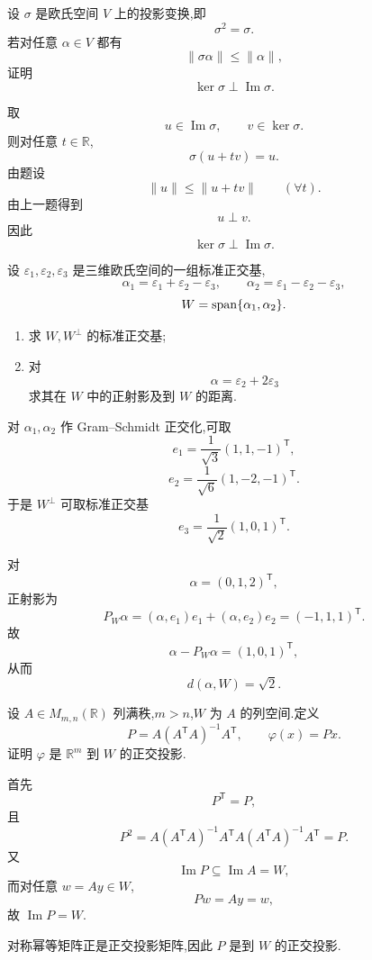 \begin{example}
设 $\sigma$ 是欧氏空间 $V$ 上的投影变换,即
\[
\sigma^2=\sigma.
\]
若对任意 $\alpha\in V$ 都有
\[
\|\sigma\alpha\|\le\|\alpha\|,
\]
证明
\[
\ker\sigma\perp\operatorname{Im}\sigma.
\]
\end{example}
\exampleblank

\begin{solution}
取
\[
u\in\operatorname{Im}\sigma,
\qquad
v\in\ker\sigma.
\]
则对任意 $t\in\mathbb{R}$,
\[
\sigma(u+tv)=u.
\]
由题设
\[
\|u\|
\le
\|u+tv\|
\qquad
(\forall t).
\]
由上一题得到
\[
u\perp v.
\]
因此
\[
\boxed{\ker\sigma\perp\operatorname{Im}\sigma}.
\]
\end{solution}


\begin{example}
设 $\varepsilon_1,\varepsilon_2,\varepsilon_3$ 是三维欧氏空间的一组标准正交基,
\[
\alpha_1=\varepsilon_1+\varepsilon_2-\varepsilon_3,
\qquad
\alpha_2=\varepsilon_1-\varepsilon_2-\varepsilon_3,
\]
\[
W=\operatorname{span}\{\alpha_1,\alpha_2\}.
\]
\begin{enumerate}
    \item 求 $W,W^\perp$ 的标准正交基;
    \item 对
    \[
    \alpha=\varepsilon_2+2\varepsilon_3
    \]
    求其在 $W$ 中的正射影及到 $W$ 的距离.
\end{enumerate}
\end{example}
\exampleblank

\begin{solution}
对 $\alpha_1,\alpha_2$ 作 Gram--Schmidt 正交化,可取
\[
 e_1
 =
 \dfrac{1}{\sqrt3}(1,1,-1)^{\mathsf T},
\]
\[
 e_2
 =
 \dfrac{1}{\sqrt6}(1,-2,-1)^{\mathsf T}.
\]
于是 $W^\perp$ 可取标准正交基
\[
\boxed{
 e_3=
 \dfrac{1}{\sqrt2}(1,0,1)^{\mathsf T}
}.
\]

对
\[
\alpha=(0,1,2)^{\mathsf T},
\]
正射影为
\[
P_W\alpha
=
(\alpha,e_1)e_1+(\alpha,e_2)e_2
=
\boxed{(-1,1,1)^{\mathsf T}}.
\]
故
\[
\alpha-P_W\alpha=(1,0,1)^{\mathsf T},
\]
从而
\[
\boxed{d(\alpha,W)=\sqrt2}.
\]
\end{solution}


\begin{example}
设 $A\in M_{m,n}(\mathbb{R})$ 列满秩,$m>n$,$W$ 为 $A$ 的列空间.定义
\[
P=A(A^{\mathsf T}A)^{-1}A^{\mathsf T},
\qquad
\varphi(x)=Px.
\]
证明 $\varphi$ 是 $\mathbb{R}^m$ 到 $W$ 的正交投影.
\end{example}
\exampleblank

\begin{solution}
首先
\[
P^{\mathsf T}=P,
\]
且
\[
P^2
=
A(A^{\mathsf T}A)^{-1}A^{\mathsf T}A(A^{\mathsf T}A)^{-1}A^{\mathsf T}
=P.
\]
又
\[
\operatorname{Im}P\subseteq\operatorname{Im}A=W,
\]
而对任意 $w=Ay\in W$,
\[
Pw=Ay=w,
\]
故 $\operatorname{Im}P=W$.

对称幂等矩阵正是正交投影矩阵,因此 $P$ 是到 $W$ 的正交投影.
\end{solution}


